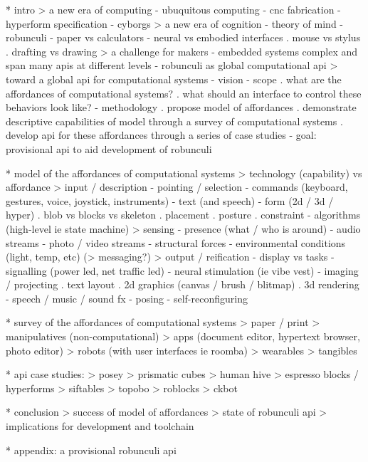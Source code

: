 * intro
  > a new era of computing
    - ubuquitous computing
    - cnc fabrication
    - hyperform specification
    - cyborgs
  > a new era of cognition
    - theory of mind
    - robunculi
    - paper vs calculators
    - neural vs embodied interfaces
      . mouse vs stylus
      . drafting vs drawing
  > a challenge for makers
    - embedded systems complex and span many apis at different levels
    - robunculi as global computational api
  > toward a global api for computational systems
    - vision
    - scope
      . what are the affordances of computational systems?
      . what should an interface to control these behaviors look like?
    - methodology
      . propose model of affordances
      . demonstrate descriptive capabilities of model through a survey of computational systems
      . develop api for these affordances through a series of case studies
    - goal: provisional api to aid development of robunculi
    
* model of the affordances of computational systems
  > technology (capability) vs affordance
  > input / description
    - pointing / selection
    - commands (keyboard, gestures, voice, joystick, instruments)
    - text (and speech)
    - form (2d / 3d / hyper)
      . blob vs blocks vs skeleton
      . placement
      . posture
      . constraint
    - algorithms (high-level ie state machine)
  > sensing
    - presence (what / who is around)
    - audio streams
    - photo / video streams
    - structural forces
    - environmental conditions (light, temp, etc)
  (> messaging?)
  > output / reification
    - display vs tasks
    - signalling (power led, net traffic led)
    - neural stimulation (ie vibe vest)
    - imaging / projecting
      . text layout
      . 2d graphics (canvas / brush / blitmap)
      . 3d rendering
    - speech / music / sound fx
    - posing
    - self-reconfiguring

* survey of the affordances of computational systems
  > paper / print
  > manipulatives (non-computational)
  > apps (document editor, hypertext browser, photo editor)
  > robots (with user interfaces ie roomba)
  > wearables
  > tangibles

* api case studies:
  > posey
  > prismatic cubes
  > human hive
  > espresso blocks / hyperforms
  > siftables
  > topobo
  > roblocks
  > ckbot

* conclusion
  > success of model of affordances
  > state of robunculi api
  > implications for development and toolchain

* appendix: a provisional robunculi api
